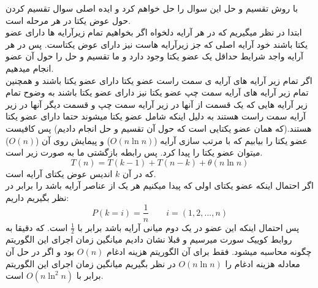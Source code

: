 \problem{}
با روش تقسیم و حل این سوال را حل خواهم کرد و ایده اصلی سوال تقسیم کردن حول
عوض یکتا در هر مرحله است.\\
ابتدا در نظر میگیریم که در هر آرایه دلخواه اگر بخواهیم تمام زیرآرایه ها دارای
عضو یکتا باشند خود آرایه اصلی که جز زیرآرایه هاست نیز دارای عوض یکتاست.
پس در هر آرایه واجد شرایط حداقل یک عضو یکتا وجود دارد و ما تقسیم و حل را
حول آن عضو انجام میدهیم.\\
اگر تمام زیر آرایه های آرایه ی سمت راست عضو یکتا دارای عضو یکتا باشند 
و همچنین تمام زیر آرایه های آرایه سمت چپ عضو یکتا نیز دارای عضو یکتا باشند
به وضوح تمام زیر آرایه هایی که یک قسمت از آنها در زیر آرایه سمت چپ
و قسمت دیگر آنها در زیر آرایه سمت راست هستند به دلیل اینکه شامل عضو یکتا میشوند
حتما دارای عضو یکتا هستند.(که همان عضو یکتایی است که حول آن تقسیم و حل انجام دادیم)
پس کافیست عضو یکتا را بیابیم که با مرتب سازی آرایه ($O(n\ln{n})$)
و پیمایش روی آن ($O(n)$)
میتوان عضو یکتا را پیدا کرد.
پس رابطه بازگشتی ما به صورت زیر است.\\
\[ T(n) = T(k-1) + T(n-k) + \theta(n\ln{n}) \]
که در آن $k$ اندیس عوض یکتای آرایه است.\\
اگر احتمال اینکه عضو یکتای اولی که پیدا میکنیم هر یک از عناصر آرایه باشد را برابر در نظر بگیریم داریم:\\
\[P(k=i) = \frac{1}{n}  \quad \quad  i = (1,2,...,n)\]
پس احتمال اینکه این عضو در یک دوم میانی آرایه باشد برابر با $\frac{1}{2}$ است.
که دقیقا به روابط کوییک سورت میرسیم و قبلا نشان دادیم میانگین زمان اجرای این الگوریتم چگونه محاسبه میشود.
فقط برای آن الگوریتم هزینه ادغام $O(n)$ بود و اگر در حل آن معادله هزینه ادغام را $O(n\ln{n})$ 
در نظر بگیریم میانگین زمان اجرای این الگوریتم برابر با $O(n\ln^2{n})$ است.